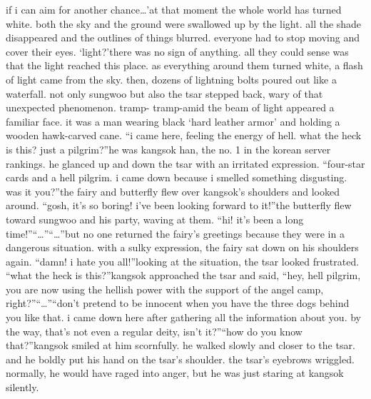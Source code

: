  if i can aim for another chance…’at that moment the whole world has turned white.
 both the sky and the ground were swallowed up by the light.
 all the shade disappeared and the outlines of things blurred.
 everyone had to stop moving and cover their eyes.
‘light?’there was no sign of anything.
 all they could sense was that the light reached this place.
as everything around them turned white, a flash of light came from the sky.
 then, dozens of lightning bolts poured out like a waterfall.
not only sungwoo but also the tsar stepped back, wary of that unexpected phenomenon.
tramp- tramp-amid the beam of light appeared a familiar face.
 it was a man wearing black ‘hard leather armor’ and holding a wooden hawk-carved cane.
“i came here, feeling the energy of hell.
 what the heck is this? just a pilgrim?”he was kangsok han, the no.
 1 in the korean server rankings.
he glanced up and down the tsar with an irritated expression.
“four-star cards and a hell pilgrim.
 i came down because i smelled something disgusting.
 was it you?”the fairy and butterfly flew over kangsok’s shoulders and looked around.
“gosh, it’s so boring! i’ve been looking forward to it!”the butterfly flew toward sungwoo and his party, waving at them.
“hi! it’s been a long time!”“…”“…”but no one returned the fairy’s greetings because they were in a dangerous situation.
with a sulky expression, the fairy sat down on his shoulders again.
“damn! i hate you all!”looking at the situation, the tsar looked frustrated.
“what the heck is this?”kangsok approached the tsar and said, “hey, hell pilgrim, you are now using the hellish power with the support of the angel camp, right?”“…”“don’t pretend to be innocent when you have the three dogs behind you like that.
 i came down here after gathering all the information about you.
 by the way, that’s not even a regular deity, isn’t it?”“how do you know that?”kangsok smiled at him scornfully.
 he walked slowly and closer to the tsar.
 and he boldly put his hand on the tsar’s shoulder.
the tsar’s eyebrows wriggled.
 normally, he would have raged into anger, but he was just staring at kangsok silently.


